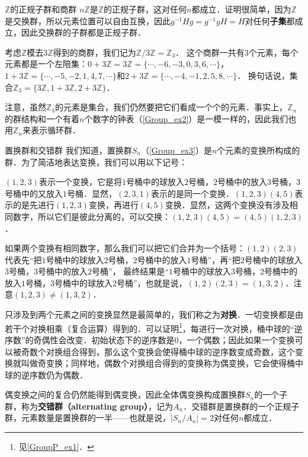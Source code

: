 \begin{example}{$\mathbb{Z}$的正规子群和商群}\label{Group1_ex4}
$n\mathbb{Z}$是$\mathbb{Z}$的正规子群，这对任何$n$都成立．证明很简单，因为$\mathbb{Z}$是交换群，所以元素位置可以自由互换，因此$g^{-1}Hg=g^{-1}gH=H$对任何\textbf{子集}都成立，因此交换群的子群都是正规子群．

考虑$\mathbb{Z}$模去$3\mathbb{Z}$得到的商群，我们记为$\mathbb{Z}/3\mathbb{Z}=\mathbb{Z}_3$． 这个商群一共有$3$个元素，每个元素都是一个左陪集：$0+3\mathbb{Z}=3\mathbb{Z}=\{\cdots, -6, -3, 0, 3, 6, \cdots\}$，$1+3\mathbb{Z}=\{\cdots, -5, -2, 1, 4, 7, \cdots\}$和$2+3\mathbb{Z}=\{\cdots, -4, -1, 2, 5, 8, \cdots\}$． 换句话说，集合$\mathbb{Z}_3=\{3\mathbb{Z}, 1+3\mathbb{Z}, 2+3\mathbb{Z}\}$．

注意，虽然$\mathbb{Z}_3$的元素是集合，我们仍然要把它们看成一个个的元素．事实上，$\mathbb{Z}_n$的群结构和一个有着$n$个数字的钟表（\autoref{Group_ex2}）是一模一样的，因此我们也用$\mathbb{Z}_n$来表示循环群． 

\end{example}

\begin{example}{置换群和交错群}\label{Group1_ex5}
我们知道，置换群$S_n$（\autoref{Group_ex3}）是$n$个元素的变换所构成的群．为了简洁地表达变换，我们可以用以下记号：

$(1,2,3)$表示一个变换，它是将$1$号桶中的球放入$2$号桶，$2$号桶中的放入$3$号桶，$3$号桶中的又放入$1$号桶．显然，$(2,3,1)$表示的是同一个变换．$(1,2,3)(4,5)$表示的是先进行$(1,2,3)$变换，再进行$(4,5)$变换．显然，这两个变换没有涉及相同数字，所以它们是彼此分离的，可以交换：$(1,2,3)(4,5)=(4,5)(1,2,3)$．

如果两个变换有相同数字，那么我们可以把它们合并为一个括号：$(1,2)(2,3)$代表先“把$1$号桶中的球放入$2$号桶，$2$号桶中的放入$1$号桶”，再“把$2$号桶中的球放入$3$号桶，$3$号桶中的放入$2$号桶”， 最终结果是“$1$号桶中的球放入$3$号桶，$2$号桶中的放入$1$号桶，$3$号桶中的球放入$2$号桶”，也就是说，$(1,2)(2,3)=(1,3,2)$．注意$(1,2,3)\not=(1,3,2)$．

只涉及到两个元素之间的变换显然是最简单的，我们称之为\textbf{对换}．一切变换都是由若干个对换相乘（复合运算）得到的．可以证明\footnote{见\autoref{GroupP_ex1}．}，每进行一次对换，桶中球的“逆序数”的奇偶性会改变．初始状态下的逆序数是$0$，一个偶数；因此如果一个变换可以被奇数个对换组合得到，那么这个变换会使得桶中球的逆序数变成奇数，这个变换就叫做奇变换；同样地，偶数个对换组合得到的变换称为偶变换，它会使得桶中球的逆序数仍为偶数．

偶变换之间的复合仍然能得到偶变换，因此全体偶变换构成置换群$S_n$的一个子群，称为\textbf{交错群（alternating group）}，记为$A_n$．交错群是置换群的一个正规子群，元素数量是置换群的一半——也就是说，$|S_n/A_n|=2$对任何$n$都成立．


\end{example}

